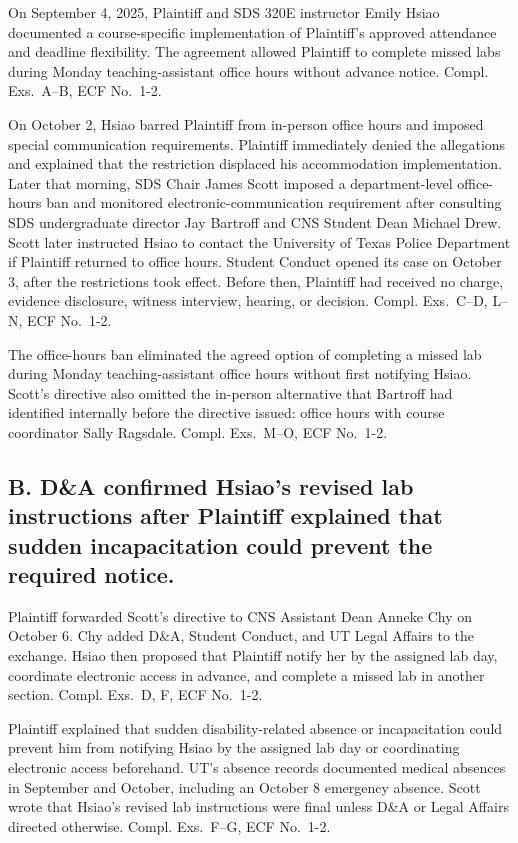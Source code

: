 \documentclass[12pt]{article}
\newcommand{\ComplExs}[1]{Compl. Exs.~#1, ECF No.~1-2}
\begin{document}
On September 4, 2025, Plaintiff and SDS 320E instructor Emily Hsiao documented a course-specific implementation of Plaintiff's approved attendance and deadline flexibility. The agreement allowed Plaintiff to complete missed labs during Monday teaching-assistant office hours without advance notice. \ComplExs{A--B}.
 
On October 2, Hsiao barred Plaintiff from in-person office hours and imposed special communication requirements. Plaintiff immediately denied the allegations and explained that the restriction displaced his accommodation implementation. Later that morning, SDS Chair James Scott imposed a department-level office-hours ban and monitored electronic-communication requirement after consulting SDS undergraduate director Jay Bartroff and CNS Student Dean Michael Drew. Scott later instructed Hsiao to contact the University of Texas Police Department if Plaintiff returned to office hours. Student Conduct opened its case on October 3, after the restrictions took effect. Before then, Plaintiff had received no charge, evidence disclosure, witness interview, hearing, or decision. \ComplExs{C--D, L--N}.
 
The office-hours ban eliminated the agreed option of completing a missed lab during Monday teaching-assistant office hours without first notifying Hsiao. Scott's directive also omitted the in-person alternative that Bartroff had identified internally before the directive issued: office hours with course coordinator Sally Ragsdale. \ComplExs{M--O}.
 
\subsection*{B. D\&A confirmed Hsiao's revised lab instructions after Plaintiff explained that sudden incapacitation could prevent the required notice.}
 
Plaintiff forwarded Scott's directive to CNS Assistant Dean Anneke Chy on October 6. Chy added D\&A, Student Conduct, and UT Legal Affairs to the exchange. Hsiao then proposed that Plaintiff notify her by the assigned lab day, coordinate electronic access in advance, and complete a missed lab in another section. \ComplExs{D, F}.
 
Plaintiff explained that sudden disability-related absence or incapacitation could prevent him from notifying Hsiao by the assigned lab day or coordinating electronic access beforehand. UT's absence records documented medical absences in September and October, including an October 8 emergency absence. Scott wrote that Hsiao's revised lab instructions were final unless D\&A or Legal Affairs directed otherwise. \ComplExs{F--G}.
 
\end{document}
